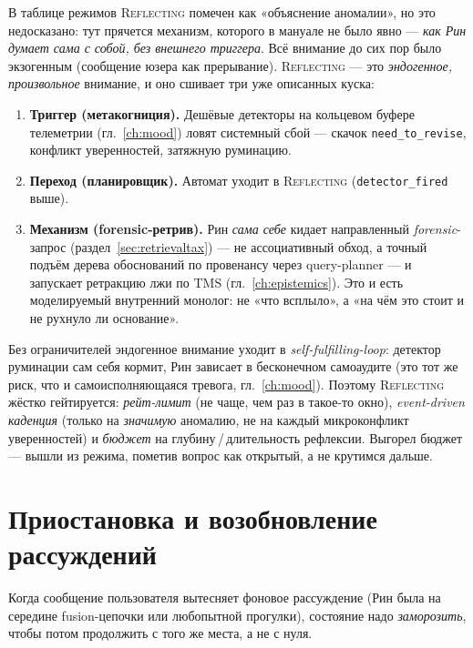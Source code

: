 В таблице режимов \textsc{Reflecting} помечен как «объяснение аномалии», но это
недосказано: тут прячется механизм, которого в мануале не было явно — \emph{как Рин
думает сама с собой, без внешнего триггера}. Всё внимание до сих пор было экзогенным
(сообщение юзера как прерывание). \textsc{Reflecting} — это \emph{эндогенное,
произвольное} внимание, и оно сшивает три уже описанных куска:
\begin{enumerate}\itemsep2pt
\item \textbf{Триггер (метакогниция).} Дешёвые детекторы на кольцевом буфере телеметрии
(гл.~\ref{ch:mood}) ловят системный сбой — скачок \texttt{need\_to\_revise}, конфликт
уверенностей, затяжную руминацию.
\item \textbf{Переход (планировщик).} Автомат уходит в \textsc{Reflecting}
(\texttt{detector\_fired} выше).
\item \textbf{Механизм (forensic-ретрив).} Рин \emph{сама себе} кидает направленный
\emph{forensic}-запрос (раздел~\ref{sec:retrievaltax}) — не ассоциативный обход, а точный
подъём дерева обоснований по провенансу через query-planner — и запускает ретракцию лжи
по TMS (гл.~\ref{ch:epistemics}). Это и есть моделируемый внутренний монолог: не «что
всплыло», а «на чём это стоит и не рухнуло ли основание».
\end{enumerate}

\begin{pitfall}
Без ограничителей эндогенное внимание уходит в \emph{self-fulfilling-loop}: детектор
руминации сам себя кормит, Рин зависает в бесконечном самоаудите (это тот же риск, что и
самоисполняющаяся тревога, гл.~\ref{ch:mood}). Поэтому \textsc{Reflecting} жёстко
гейтируется: \emph{рейт-лимит} (не чаще, чем раз в такое-то окно), \emph{event-driven
каденция} (только на \emph{значимую} аномалию, не на каждый микроконфликт уверенностей)
и \emph{бюджет} на глубину\,/\,длительность рефлексии. Выгорел бюджет — вышли из режима,
пометив вопрос как открытый, а не крутимся дальше.
\end{pitfall}

\section{Приостановка и возобновление рассуждений}
\label{sec:suspend}

Когда сообщение пользователя вытесняет фоновое рассуждение (Рин была на середине
fusion-цепочки или любопытной прогулки), состояние надо \emph{заморозить}, чтобы потом
продолжить с того же места, а не с нуля.

